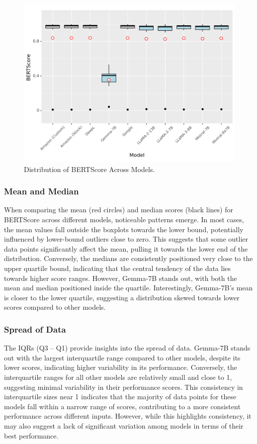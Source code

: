 \begin{figure}[htb]
        \centering
        \includegraphics[width=.9\textwidth]{textual/Figuras/Results/Unknown-93.png}
        \caption{Distribution of BERTScore Across Models.}
        \label{fig: bertscore-models}
\end{figure}

        
\subsubsection{Mean and Median}

When comparing the mean (red circles) and median scores (black lines) for BERTScore across different models, noticeable patterns emerge. In most cases, the mean values fall outside the boxplots towards the lower bound, potentially influenced by lower-bound outliers close to zero. This suggests that some outlier data points significantly affect the mean, pulling it towards the lower end of the distribution. Conversely, the medians are consistently positioned very close to the upper quartile bound, indicating that the central tendency of the data lies towards higher score ranges. However, Gemma-7B stands out, with both the mean and median positioned inside the quartile. Interestingly, Gemma-7B's mean is closer to the lower quartile, suggesting a distribution skewed towards lower scores compared to other models.


\subsubsection{Spread of Data}

The IQRs (Q3 -- Q1) provide insights into the spread of data. Gemma-7B stands out with the largest interquartile range compared to other models, despite its lower scores, indicating higher variability in its performance. Conversely, the interquartile ranges for all other models are relatively small and close to 1, suggesting minimal variability in their performance scores. This consistency in interquartile sizes near 1 indicates that the majority of data points for these models fall within a narrow range of scores, contributing to a more consistent performance across different inputs. However, while this highlights consistency, it may also suggest a lack of significant variation among models in terms of their best performance.


